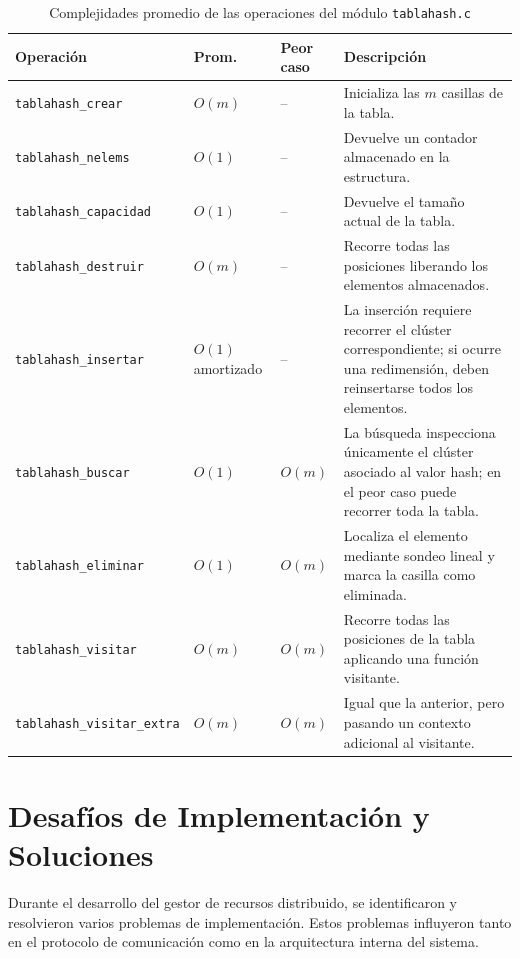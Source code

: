 \documentclass[12pt,a4paper]{article}
\begin{document}
\begin{table}[h!]
\centering
\begin{tabular}{@{}lllp{6.5cm}@{}}
\toprule
\textbf{Operación} & \textbf{Prom.} & \textbf{Peor caso} & \textbf{Descripción} \\
\midrule
\texttt{tablahash\_crear}         & $O(m)$ & --     & Inicializa las $m$ casillas de la tabla. \\
\texttt{tablahash\_nelems}        & $O(1)$ & --     & Devuelve un contador almacenado en la estructura. \\
\texttt{tablahash\_capacidad}     & $O(1)$ & --     & Devuelve el tamaño actual de la tabla. \\
\texttt{tablahash\_destruir}      & $O(m)$ & --     & Recorre todas las posiciones liberando los elementos almacenados. \\
\texttt{tablahash\_insertar}      & $O(1)$ amortizado & -- & La inserción requiere recorrer el clúster correspondiente; si ocurre una redimensión, deben reinsertarse todos los elementos. \\
\texttt{tablahash\_buscar}        & $O(1)$ & $O(m)$ & La búsqueda inspecciona únicamente el clúster asociado al valor hash; en el peor caso puede recorrer toda la tabla. \\
\texttt{tablahash\_eliminar}      & $O(1)$ & $O(m)$ & Localiza el elemento mediante sondeo lineal y marca la casilla como eliminada. \\
\texttt{tablahash\_visitar}       & $O(m)$ & $O(m)$ & Recorre todas las posiciones de la tabla aplicando una función visitante. \\
\texttt{tablahash\_visitar\_extra} & $O(m)$ & $O(m)$ & Igual que la anterior, pero pasando un contexto adicional al visitante. \\
\bottomrule
\end{tabular}
\caption{Complejidades promedio de las operaciones del módulo \texttt{tablahash.c}}
\end{table}

\section{Desafíos de Implementación y Soluciones}

Durante el desarrollo del gestor de recursos distribuido, se identificaron y resolvieron varios problemas de implementación. Estos problemas influyeron tanto en el protocolo de comunicación como en la arquitectura interna del sistema.
\end{document}
